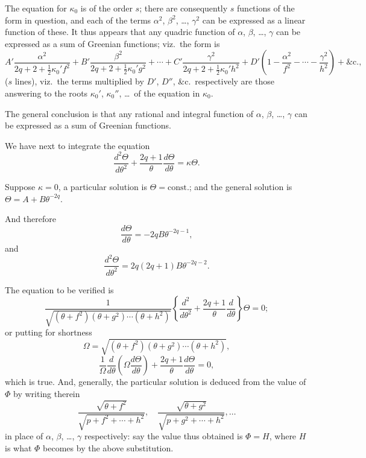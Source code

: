 \documentclass[11pt,a4paper]{book}
\begin{document}
\begin{art}\label{art:122}
The equation for $\kappa_0$ is of the order $s$; there are consequently $s$ functions of the form in question, and each of the terms $\alpha^2$, $\beta^2$, \ldots, $\gamma^2$ can be expressed as a linear function of these. It thus appears that any quadric function of $\alpha$, $\beta$, \ldots, $\gamma$ can be expressed as a sum of Greenian functions; viz.\ the form is
\[
A'\frac{\alpha^2}{2q+2+\frac{1}{2}\kappa_0' f^2} + B'\frac{\beta^2}{2q+2+\frac{1}{2}\kappa_0' g^2} + \cdots + C'\frac{\gamma^2}{2q+2+\frac{1}{2}\kappa_0' h^2} + D'\left(1 - \frac{\alpha^2}{f^2} - \cdots - \frac{\gamma^2}{h^2}\right) + \text{\&c.},
\]
($s$ lines), viz.\ the terms multiplied by $D'$, $D''$, \&c.\ respectively are those answering to the roots $\kappa_0'$, $\kappa_0''$, \ldots\ of the equation in $\kappa_0$.

The general conclusion is that any rational and integral function of $\alpha$, $\beta$, \ldots, $\gamma$ can be expressed as a sum of Greenian functions.
\end{art}

\begin{art}\label{art:123}
We have next to integrate the equation
\[
\frac{d^2\Theta}{d\theta^2} + \frac{2q+1}{\theta}\frac{d\Theta}{d\theta} = \kappa\Theta.
\]

Suppose $\kappa = 0$, a particular solution is $\Theta = \text{const.}$; and the general solution is $\Theta = A + B\theta^{-2q}$.
\end{art}

\begin{art}\label{art:124}
And therefore
\[
\frac{d\Theta}{d\theta} = -2qB\theta^{-2q-1},
\]
and
\[
\frac{d^2\Theta}{d\theta^2} = 2q(2q+1)B\theta^{-2q-2}.
\]

The equation to be verified is
\[
\frac{1}{\sqrt{(\theta+f^2)(\theta+g^2)\cdots(\theta+h^2)}} \left\{\frac{d^2}{d\theta^2} + \frac{2q+1}{\theta}\frac{d}{d\theta}\right\} \Theta = 0;
\]
or putting for shortness
\[
\Omega = \sqrt{(\theta+f^2)(\theta+g^2)\cdots(\theta+h^2)},
\]
\[
\frac{1}{\Omega}\frac{d}{d\theta}\left(\Omega\frac{d\Theta}{d\theta}\right) + \frac{2q+1}{\theta}\frac{d\Theta}{d\theta} = 0,
\]
which is true. And, generally, the particular solution is deduced from the value of $\Phi$ by writing therein
\[
\frac{\sqrt{\theta+f^2}}{\sqrt{p+f^2+\cdots+h^2}}, \quad \frac{\sqrt{\theta+g^2}}{\sqrt{p+g^2+\cdots+h^2}}, \ldots
\]
in place of $\alpha$, $\beta$, \ldots, $\gamma$ respectively: say the value thus obtained is $\Phi = H$, where $H$ is what $\Phi$ becomes by the above substitution.
\end{art}
\end{document}
